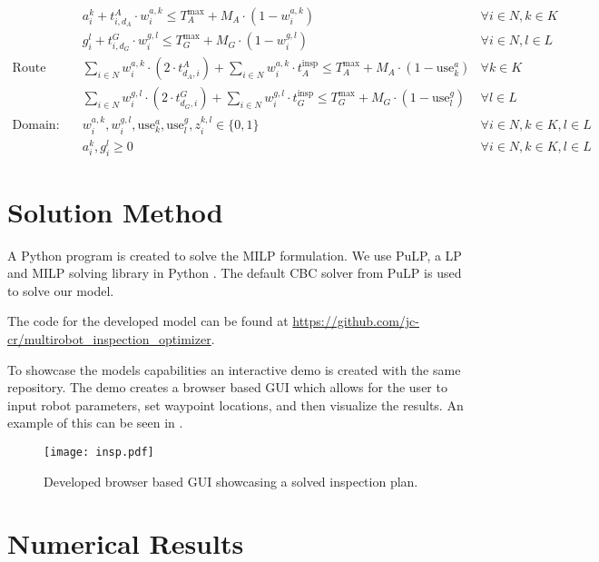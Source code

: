 \documentclass{article}
\begin{document}
{\begin{align}
		& a_i^k + t_{i,d_A}^{A} \cdot w_i^{a,k} \leq T_A^{\max} + M_A \cdot (1 - w_i^{a,k}) & \forall i \in N, k \in K \tag{17} \\
		& g_i^l + t_{i,d_G}^{G} \cdot w_i^{g,l} \leq T_G^{\max} + M_G \cdot (1 - w_i^{g,l}) & \forall i \in N, l \in L \tag{18} \\
		\text{Route Length:} \quad & \sum_{i \in N} w_i^{a,k} \cdot \left( 2 \cdot t_{d_A,i}^{A}\right) + \sum_{i \in N} w_i^{a,k} \cdot t_A^{\text{insp}} \leq T_A^{\max} + M_A \cdot (1 - \text{use}_k^a) & \forall k \in K \tag{19} \\
		& \sum_{i \in N} w_i^{g,l} \cdot \left( 2 \cdot t_{d_G,i}^{G}\right) + \sum_{i \in N} w_i^{g,l} \cdot t_G^{\text{insp}} \leq T_G^{\max} + M_G \cdot (1 - \text{use}_l^g) & \forall l \in L \tag{20} \\
		\text{Domain:} \quad & w_i^{a,k}, w_i^{g,l}, \text{use}_k^a, \text{use}_l^g, z_i^{k,l} \in \{0,1\} & \forall i \in N, k \in K, l \in L \tag{21} \\
		& a_i^k, g_i^l \geq 0 & \forall i \in N, k \in K, l \in L \tag{22}
		\end{align}
		}


	\section{Solution Method}\label{sol_methods}

		A Python program is created to solve the MILP formulation. 
		We use PuLP, a LP and MILP solving library in Python \cite{pulp}.
		The default CBC solver from PuLP is used to solve our model.

		The code for the developed model can be found at \url{https://github.com/jc-cr/multirobot_inspection_optimizer}.

		To showcase the models capabilities an interactive demo is created with the same repository. 
		The demo creates a browser based GUI which allows for the user to input robot parameters, set waypoint locations, and then visualize the results.
		An example of this can be seen in .

		\begin{figure}[htbp]
			\centering
			\texttt{[image: insp.pdf]}
			\caption{Developed browser based GUI showcasing a solved inspection plan.}
			\label{fig:demo}
		\end{figure}


	\section{Numerical Results}\label{numerical_results}
\end{document}
